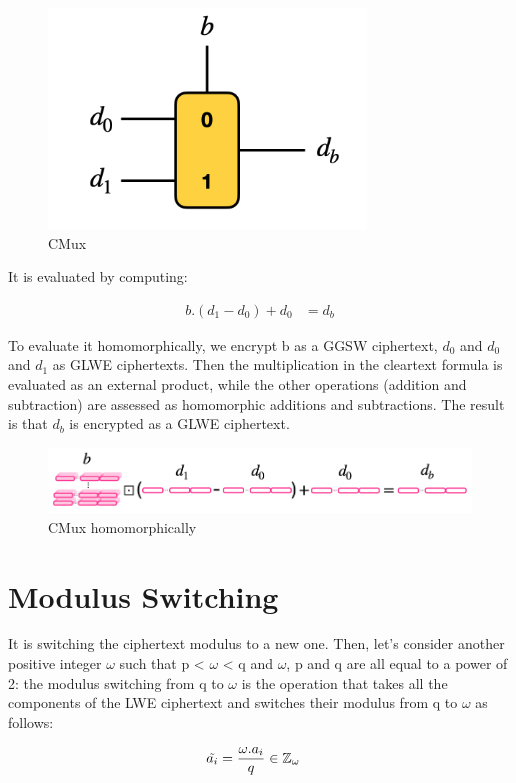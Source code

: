 \documentclass{techrep}
\theoremstyle{definition}
\theoremstyle{plain}
\newcommand{\Z}{\mathbb{Z}}
\begin{document}
	\begin{figure}[H]
		\centering
	\includegraphics[width=0.5\columnwidth]{fig/cmux.png}
		\caption{CMux}
		\label{fig:CMux}
	\end{figure}

It is evaluated by computing:

	\begin{align*}
b.(d_1 - d_0) + d_0	&=	 d_b
	\end{align*}


To evaluate it homomorphically, we encrypt b as a GGSW ciphertext, $d_0$ and $d_0$ and $d_1$ as GLWE ciphertexts. Then the multiplication in the cleartext formula is evaluated as an external product, while the other operations (addition and subtraction) are assessed as homomorphic additions and subtractions. The result is that $d_b$ is encrypted as a GLWE ciphertext.


	\begin{figure}[H]
		\centering
	\includegraphics[width=0.9\columnwidth]{fig/cmux_1.png}
		\caption{CMux homomorphically}
		\label{fig:CMux1}
	\end{figure}

\section{Modulus Switching}
 It is switching the ciphertext modulus to a new one. Then, let's consider another positive integer $\omega$ such that p < $\omega$ < q and $\omega$, p and q are all equal to a power of 2: the modulus switching from q to  $\omega$ is the operation that takes all the components of the LWE ciphertext and switches their modulus from q to $\omega$ as follows:

	\begin{align*}
\Tilde{a_i}	&=	 \frac{\omega.a_i}{q} \in \Z_\omega
	\end{align*}
\end{document}
